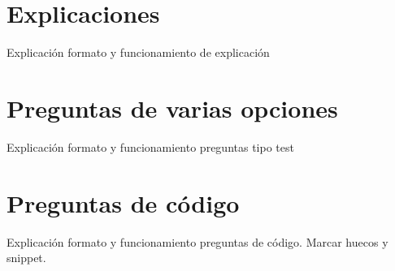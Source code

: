 \documentclass[]{article}
\begin{document}
\section{Explicaciones}
Explicación formato y funcionamiento de explicación

\section{Preguntas de varias opciones}
Explicación formato y funcionamiento preguntas tipo test

\section{Preguntas de código}
Explicación formato y funcionamiento preguntas de código. Marcar huecos y snippet.
\end{document}
